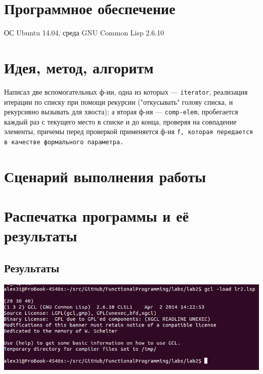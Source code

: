 \documentclass[12pt]{article}
\begin{document}
\section{Программное обеспечение}
ОС Ubuntu 14.04, среда GNU Common Lisp 2.6.10

\section{Идея, метод, алгоритм}
Написал две вспомогательных ф-ии, одна из которых --- {\color{blue}\tt{iterator}}, реализация итерации по списку при помощи рекурсии ("откусывать" голову списка, и рекурсивно вызывать для хвоста); а вторая ф-ия --- {\color{blue}\tt{comp-elem}}, пробегается каждый раз с текущего место в списке и до конца, проверяя на совпадение элементы, причемы перед проверкой применяется ф-ия \tt{f}, которая передается в качестве формального параметра.

\section{Сценарий выполнения работы}
\section{Распечатка программы и её результаты}

\subsection{Результаты}
\includegraphics[scale=0.7]{lr2Screen}

%

\end{document}
